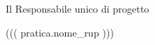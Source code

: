 \begin{flushright}
\begin{minipage}[c]{6cm}
\begin{center}
Il Responsabile unico di progetto

((( pratica.nome_rup )))

\end{center}
\end{minipage}
\end{flushright}

